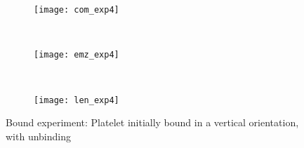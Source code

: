\documentclass{article}
\begin{document}
\begin{figure}
  \centering
  \begin{subfigure}{.5\textwidth}
    \texttt{[image: com\_exp4]}
  \end{subfigure}
  \\
  \begin{subfigure}{.5\textwidth}
    \texttt{[image: emz\_exp4]}
  \end{subfigure}
  \\
  \begin{subfigure}{.5\textwidth}
    \texttt{[image: len\_exp4]}
  \end{subfigure}
  \caption{Bound experiment: Platelet initially bound in a vertical
    orientation, with unbinding}
  \label{fig:exp4}
\end{figure}



\end{document}
